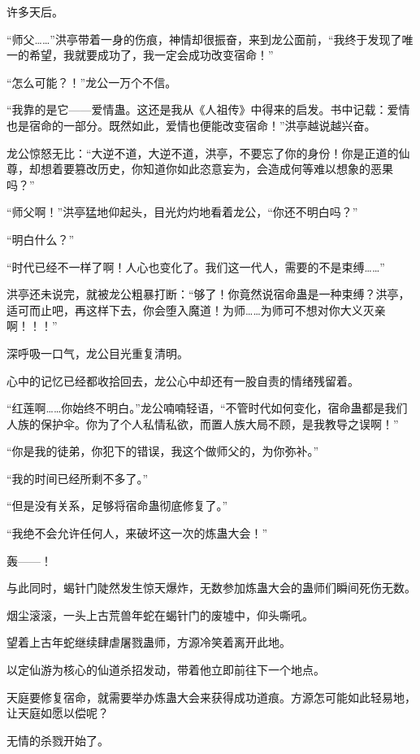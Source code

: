 \begin{this_body}
许多天后。

“师父……”洪亭带着一身的伤痕，神情却很振奋，来到龙公面前，“我终于发现了唯一的希望，我就要成功了，我一定会成功改变宿命！”

“怎么可能？！”龙公一万个不信。

“我靠的是它——爱情蛊。这还是我从《人祖传》中得来的启发。书中记载：爱情也是宿命的一部分。既然如此，爱情也便能改变宿命！”洪亭越说越兴奋。

龙公惊怒无比：“大逆不道，大逆不道，洪亭，不要忘了你的身份！你是正道的仙尊，却想着要篡改历史，你知道你如此恣意妄为，会造成何等难以想象的恶果吗？”

“师父啊！”洪亭猛地仰起头，目光灼灼地看着龙公，“你还不明白吗？”

“明白什么？”

“时代已经不一样了啊！人心也变化了。我们这一代人，需要的不是束缚……”

洪亭还未说完，就被龙公粗暴打断：“够了！你竟然说宿命蛊是一种束缚？洪亭，适可而止吧，再这样下去，你会堕入魔道！为师……为师可不想对你大义灭亲啊！！！”

深呼吸一口气，龙公目光重复清明。

心中的记忆已经都收拾回去，龙公心中却还有一股自责的情绪残留着。

“红莲啊……你始终不明白。”龙公喃喃轻语，“不管时代如何变化，宿命蛊都是我们人族的保护伞。你为了个人私情私欲，而置人族大局不顾，是我教导之误啊！”

“你是我的徒弟，你犯下的错误，我这个做师父的，为你弥补。”

“我的时间已经所剩不多了。”

“但是没有关系，足够将宿命蛊彻底修复了。”

“我绝不会允许任何人，来破坏这一次的炼蛊大会！”

轰——！

与此同时，蝎针门陡然发生惊天爆炸，无数参加炼蛊大会的蛊师们瞬间死伤无数。

烟尘滚滚，一头上古荒兽年蛇在蝎针门的废墟中，仰头嘶吼。

望着上古年蛇继续肆虐屠戮蛊师，方源冷笑着离开此地。

以定仙游为核心的仙道杀招发动，带着他立即前往下一个地点。

天庭要修复宿命，就需要举办炼蛊大会来获得成功道痕。方源怎可能如此轻易地，让天庭如愿以偿呢？

无情的杀戮开始了。

\end{this_body}

